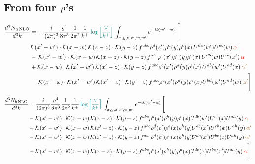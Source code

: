 \documentclass[9pt]{article}
\numberwithin{equation}{section}
\begin{document}
\subsection{From four $\rho$'s}
\begin{align}
    \frac{d^{3}N_{a\,\rm NLO}}{d^{3}k} & = -\,\frac{i}{(2\pi)^{3}}\frac{g^{4}}{8\pi^{3}}\frac{1}{2\pi^{2}} \frac{1}{k^{+}}\,{\color{teal}\log{\left[\frac{\vee}{k^{+}}\right]}}\,\int_{x,y,z,x^{\prime},w,w^{\prime}}e^{-ik(w^{\prime}-w)}\, \Bigg[\notag \\ &  \mathcal{K}(x'-w')\cdot \mathcal{K}(x-w)\, \mathcal{K}(x-z)\cdot \mathcal{K}(y-z)\, f^{a b c} \rho^{d}(x') \rho^{a}(y) \rho^{c}(x)\,U^{d e}(w') U^{e b}(w)\, {\color{red} \alpha} \nonumber\\
    &  -\,\mathcal{K}(x'-w')\cdot \mathcal{K}(x-w)\, \mathcal{K}(x-z)\cdot \mathcal{K}(y-z)\, f^{a b c} \rho^{e}(x') \rho^{a}(y) \rho^{c}(x)\, U^{d b}(w) U^{e d}(x')\, {\color{red} \alpha}\nonumber\\
    & + \mathcal{K}(x-w)\cdot \mathcal{K}(x'-w')\, \mathcal{K}(x'-z)\cdot \mathcal{K}(y-z)\, f^{a b c} \rho^{c}(x') \rho^{a}(y) \rho^{e}(x)\,U^{d b}(w') U^{e d}(x)\, {\color{brown} \alpha'} \nonumber\\
    & -\,\mathcal{K}(x-w)\cdot \mathcal{K}(x'-w')\, \mathcal{K}(x'-z)\cdot \mathcal{K}(y-z)\, f^{a b c} \rho^{c}(x') \rho^{a}(y) \rho^{e}(x) U^{b d}(w') U^{e d}(w)\, {\color{brown} \alpha'}\Bigg]
\end{align}
\begin{align}
      \frac{d^{3}N_{b\,\rm NLO}}{d^{3}k} & = \frac{i}{(2\pi)^{3}}\frac{g^{4}}{8\pi^{3}}\frac{1}{2\pi^{2}} \frac{1}{k^{+}}\,{\color{teal}\log{\left[\frac{\vee}{k^{+}}\right]}}\,\int_{x,y,z,x^{\prime},w,w^{\prime}}e^{-ik(w^{\prime}-w)}\, \Bigg[\notag \\ & - \mathcal{K}(x'-w')\cdot \mathcal{K}(x-w)\, \mathcal{K}(x-z)\cdot \mathcal{K}(y-z)\, f^{a b c} \rho^{d}(x') \rho^{h}(y) \rho^{e}(x) U^{d b}(w') U^{e c}(x) U^{a h}(y)\, {\color{red} \alpha}\nonumber\\
    &+ \mathcal{K}(x'-w')\cdot \mathcal{K}(x-w)\,\mathcal{K}(x'-z)\cdot \mathcal{K}(y-z)\, f^{a b c} \rho^{d}(x') \rho^{e}(x) \rho^{h}(y) U^{d c}(x') U^{e b}(w) U^{a h}(y)\, {\color{brown} \alpha'}\nonumber\\
    &- \mathcal{K}(x'-w')\cdot \mathcal{K}(x-w)\,\mathcal{K}(x'-z)\cdot \mathcal{K}(y-z)\, f^{a b c} \rho^{d}(x') \rho^{e}(x) \rho^{h}(y) U^{d c}(x') U^{b e}(x) U^{a h}(y)\, {\color{brown} \alpha'}\nonumber\\
    &+  \mathcal{K}(x'-w')\cdot \mathcal{K}(x-w)\, \mathcal{K}(x-z)\cdot \mathcal{K}(y-z)\, f^{a b c} \rho^{e}(x') \rho^{h}(y) \rho^{d}(x) U^{d c}(x) U^{b e}(x') U^{a h}(y)\, {\color{red} \alpha} \Bigg]
\end{align}
\end{document}

